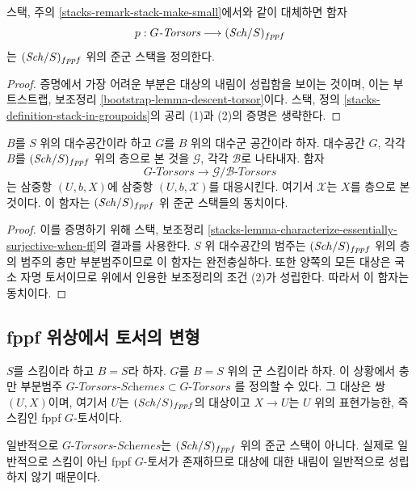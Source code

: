 \begin{lemma}
\label{lemma-torsors-stack-in-groupoids}
스택, 주의 \ref{stacks-remark-stack-make-small}에서와 같이 대체하면 함자
$$
p : G\textit{-Torsors} \longrightarrow (\mathit{Sch}/S)_{fppf}
$$
는 $(\mathit{Sch}/S)_{fppf}$ 위의 준군 스택을 정의한다.
\end{lemma}

\begin{proof}
증명에서 가장 어려운 부분은 대상의 내림이 성립함을 보이는 것이며, 이는
부트스트랩, 보조정리 \ref{bootstrap-lemma-descent-torsor}이다.
스택, 정의 \ref{stacks-definition-stack-in-groupoids}의 공리 (1)과 (2)의
증명은 생략한다.
\end{proof}

\begin{lemma}
\label{lemma-compare-torsors}
$B$를 $S$ 위의 대수공간이라 하고 $G$를 $B$ 위의 대수군 공간이라 하자.
대수공간 $G$, 각각 $B$를 $(\mathit{Sch}/S)_{fppf}$ 위의 층으로 본 것을
$\mathcal{G}$, 각각 $\mathcal{B}$로 나타내자. 함자
$$
G\textit{-Torsors} \longrightarrow \mathcal{G}/\mathcal{B}\textit{-Torsors}
$$
는 삼중항 $(U, b, X)$에 삼중항 $(U, b, \mathcal{X})$를 대응시킨다.
여기서 $\mathcal{X}$는 $X$를 층으로 본 것이다. 이 함자는
$(\mathit{Sch}/S)_{fppf}$ 위 준군 스택들의 동치이다.
\end{lemma}

\begin{proof}
이를 증명하기 위해 스택, 보조정리
\ref{stacks-lemma-characterize-essentially-surjective-when-ff}의 결과를
사용한다. $S$ 위 대수공간의 범주는 $(\mathit{Sch}/S)_{fppf}$ 위의 층의 범주의
충만 부분범주이므로 이 함자는 완전충실하다. 또한 양쪽의 모든 대상은
국소 자명 토서이므로 위에서 인용한 보조정리의 조건 (2)가 성립한다.
따라서 이 함자는 동치이다.
\end{proof}



\subsection{fppf 위상에서 토서의 변형}
\label{subsection-variant-fppf-torsors}

\noindent
$S$를 스킴이라 하고 $B = S$라 하자. $G$를 $B = S$ 위의 군 스킴이라 하자.
이 상황에서 충만 부분범주
$G\textit{-Torsors-Schemes} \subset G\textit{-Torsors}$
를 정의할 수 있다. 그 대상은 쌍 $(U, X)$이며, 여기서 $U$는
$(\mathit{Sch}/S)_{fppf}$의 대상이고 $X \to U$는 $U$ 위의 표현가능한, 즉 스킴인
fppf $G$-토서이다.

\medskip\noindent
일반적으로 $G\textit{-Torsors-Schemes}$는 $(\mathit{Sch}/S)_{fppf}$ 위의 준군
스택이 아니다. 실제로 일반적으로 스킴이 아닌 fppf $G$-토서가 존재하므로
대상에 대한 내림이 일반적으로 성립하지 않기 때문이다.






